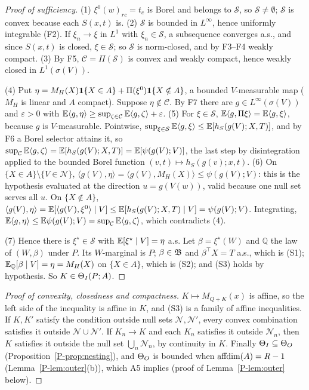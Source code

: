 \begin{proof}[Proof of sufficiency]
(1) $\xi^0(w)_{rc}=t_c$ is Borel and belongs to $\mathcal S$, so $\mathcal S\ne\emptyset$;
$\mathcal S$ is convex because each $S(x,t)$ is. (2) $\mathcal S$ is bounded in
$L^\infty$, hence uniformly integrable (F2). If $\xi_n\to\xi$ in $L^1$ with
$\xi_n\in\mathcal S$, a subsequence converges a.s., and since $S(x,t)$ is closed,
$\xi\in\mathcal S$; so $\mathcal S$ is norm-closed, and by F3--F4 weakly compact.
(3) By F5, $\mathcal C=\Pi(\mathcal S)$ is convex and weakly compact, hence weakly
closed in $L^1(\sigma(V))$.

(4) Put $\eta=M_H(X)\mathbf 1\{X\in A\}+\Pi(\xi^0)\mathbf 1\{X\notin A\}$, a bounded
$V$-measurable map ($M_H$ is linear and $A$ compact). Suppose $\eta\notin\mathcal C$.
By F7 there are $g\in L^\infty(\sigma(V))$ and $\varepsilon>0$ with
$\mathbb E\langle g,\eta\rangle\ge\sup_{\zeta\in\mathcal C}\mathbb E\langle g,\zeta\rangle+\varepsilon$.
(5) For $\xi\in\mathcal S$, $\mathbb E\langle g,\Pi\xi\rangle=\mathbb E\langle g,\xi\rangle$, because
$g$ is $V$-measurable. Pointwise, $\sup_{\xi\in\mathcal S}\mathbb E\langle g,\xi\rangle\le
\mathbb E[h_S(g(V);X,T)]$, and by F6 a Borel selector attains it, so
$\sup_{\mathcal C}\mathbb E\langle g,\zeta\rangle=\mathbb E[h_S(g(V);X,T)]=\mathbb E[\psi(g(V);V)]$, the last
step by disintegration applied to the bounded Borel function
$(v,t)\mapsto h_S(g(v);x,t)$.
(6) On $\{X\in A\}\setminus\{V\in\mathcal N\}$,
$\langle g(V),\eta\rangle=\langle g(V),M_H(X)\rangle\le\psi(g(V);V)$: this is the
hypothesis evaluated at the direction $u=g(V(w))$, valid because one null set serves
all $u$. On $\{X\notin A\}$,
$\langle g(V),\eta\rangle=\mathbb E[\langle g(V),\xi^0\rangle\mid V]\le\mathbb E[h_S(g(V);X,T)\mid V]=\psi(g(V);V)$.
Integrating, $\mathbb E\langle g,\eta\rangle\le\mathbb E\psi(g(V);V)=\sup_{\mathcal C}\mathbb E\langle g,\zeta\rangle$,
which contradicts (4).

(7) Hence there is $\xi^\star\in\mathcal S$ with $\mathbb E[\xi^\star\mid V]=\eta$ a.s. Let
$\beta=\xi^\star(W)$ and $\mathbb Q$ the law of $(W,\beta)$ under $P$. Its $W$-marginal is
$P$; $\beta\in\mathfrak B$ and $\beta^\top X=T$ a.s., which is (S1);
$\mathbb E_{\mathbb Q}[\beta\mid V]=\eta=M_H(X)$ on $\{X\in A\}$, which is (S2); and (S3)
holds by hypothesis. So $K\in\Theta_I(P;A)$.
\end{proof}

\begin{proof}[Proof of convexity, closedness and compactness]
$K\mapsto M_{Q+K}(x)$ is affine, so the left side of the inequality is affine in $K$,
and (S3) is a family of affine inequalities. If $K,K'$ satisfy the condition outside
null sets $\mathcal N,\mathcal N'$, every convex combination satisfies it outside
$\mathcal N\cup\mathcal N'$. If $K_n\to K$ and each $K_n$ satisfies it outside
$\mathcal N_n$, then $K$ satisfies it outside the null set $\bigcup_n\mathcal N_n$, by
continuity in $K$. Finally $\Theta_I\subseteq\Theta_O$ (Proposition~\ref{P-prop:nesting}),
and $\Theta_O$ is bounded when $\operatorname{affdim}(A)=R-1$ (Lemma~\ref{P-lem:outer}(b)), which A5
implies (proof of Lemma~\ref{P-lem:outer} below).
\end{proof}

